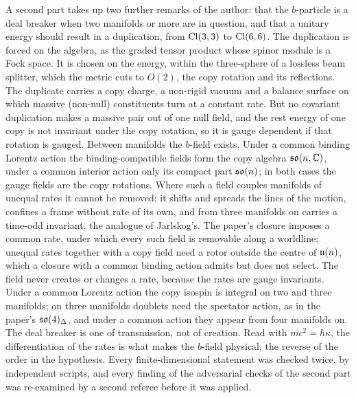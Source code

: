 A second part takes up two further remarks of the author: that the $b$-particle is a deal breaker when two manifolds or more are in
question, and that a unitary energy should result in a duplication, from $\mathrm{Cl}(3,3)$ to $\mathrm{Cl}(6,6)$. The duplication is forced on the algebra,
as the graded tensor product whose spinor module is a Fock space. It is chosen on the energy, within the three-sphere of a lossless beam
splitter, which the metric cuts to $O(2)$, the copy rotation and its reflections. The duplicate carries a copy charge, a non-rigid vacuum and
a balance surface on which massive (non-null) constituents turn at a constant rate. But no covariant duplication makes a massive pair out of
one null field, and the rest energy of one copy is not invariant under the copy rotation, so it is gauge dependent if that rotation is
gauged. Between manifolds the $b$-field exists. Under a common binding Lorentz action the binding-compatible fields form the copy algebra
$\mathfrak{so}(n,\mathbb{C})$, under a common interior action only its compact part $\mathfrak{so}(n)$; in both cases the gauge fields are the copy rotations. Where such a
field couples manifolds of unequal rates it cannot be removed: it shifts and spreads the lines of the motion, confines a frame without rate of
its own, and from three manifolds on carries a time-odd invariant, the analogue of Jarlskog's. The paper's closure imposes a common rate,
under which every such field is removable along a worldline; unequal rates together with a copy field need a rotor outside the centre of
$\mathfrak{u}(n)$, which a closure with a common binding action admits but does not select. The field never creates or changes a rate, because the
rates are gauge invariants. Under a common Lorentz action the copy isospin is integral on two and three manifolds; on three manifolds
doublets need the spectator action, as in the paper's $\mathfrak{so}(4)_\Delta$, and under a common action they appear from four manifolds on. The deal
breaker is one of transmission, not of creation. Read with $mc^2=\hbar\kappa$, the differentiation of the rates is what makes the $b$-field
physical, the reverse of the order in the hypothesis. Every finite-dimensional statement was checked twice, by independent scripts, and every
finding of the adversarial checks of the second part was re-examined by a second referee before it was applied.
